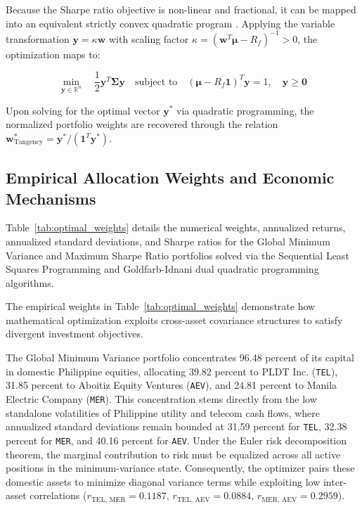 Because the Sharpe ratio objective is non-linear and fractional, it can be mapped into an equivalent strictly convex quadratic program \parencite{sharpe1964}. Applying the variable transformation $\mathbf{y} = \kappa \mathbf{w}$ with scaling factor $\kappa = (\mathbf{w}^T \boldsymbol{\mu} - R_f)^{-1} > 0$, the optimization maps to:

\begin{equation}
  \min_{\mathbf{y} \in \mathbb{R}^n} \quad \frac{1}{2} \mathbf{y}^T \boldsymbol{\Sigma} \mathbf{y} \quad \text{subject to} \quad (\boldsymbol{\mu} - R_f \mathbf{1})^T \mathbf{y} = 1, \quad \mathbf{y} \ge \mathbf{0}
\end{equation}

Upon solving for the optimal vector $\mathbf{y}^*$ via quadratic programming, the normalized portfolio weights are recovered through the relation $\mathbf{w}_{\text{Tangency}}^* = \mathbf{y}^* / (\mathbf{1}^T \mathbf{y}^*)$.

\subsection{Empirical Allocation Weights and Economic Mechanisms}

Table~\ref{tab:optimal_weights} details the numerical weights, annualized returns, annualized standard deviations, and Sharpe ratios for the Global Minimum Variance and Maximum Sharpe Ratio portfolios solved via the Sequential Least Squares Programming and Goldfarb-Idnani dual quadratic programming algorithms.



The empirical weights in Table~\ref{tab:optimal_weights} demonstrate how mathematical optimization exploits cross-asset covariance structures to satisfy divergent investment objectives.

The Global Minimum Variance portfolio concentrates 96.48 percent of its capital in domestic Philippine equities, allocating 39.82 percent to PLDT Inc. (\texttt{TEL}), 31.85 percent to Aboitiz Equity Ventures (\texttt{AEV}), and 24.81 percent to Manila Electric Company (\texttt{MER}). This concentration stems directly from the low standalone volatilities of Philippine utility and telecom cash flows, where annualized standard deviations remain bounded at 31.59 percent for \texttt{TEL}, 32.38 percent for \texttt{MER}, and 40.16 percent for \texttt{AEV}. Under the Euler risk decomposition theorem, the marginal contribution to risk must be equalized across all active positions in the minimum-variance state. Consequently, the optimizer pairs these domestic assets to minimize diagonal variance terms while exploiting low inter-asset correlations ($r_{\text{TEL, MER}} = 0.1187$, $r_{\text{TEL, AEV}} = 0.0884$, $r_{\text{MER, AEV}} = 0.2959$).

